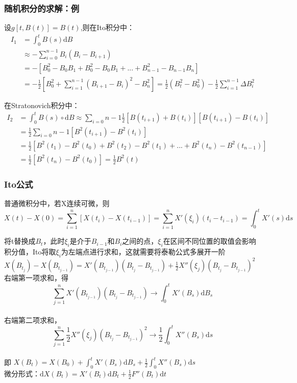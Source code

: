 \documentclass{ctexbeamer}
\begin{document}
	\begin{frame}

		\frametitle{随机积分的求解：例}
		\footnotesize
		设$g[t,B(t)]=B(t)$,则在Ito积分中：
		\begin{align}
		I_1 &= \int_0^t B(s)\mathrm{d}B \\ 
		    &\approx -\sum_{i=0}^{n-1}B_i(B_i-B_{i+1}) \\
			&=-[B_0^2-B_0B_1+B_0^2-B_0B_1+...+B_{n-1}^2-B_{n-1}B_n] \\
			&=-\frac{1}{2}[B_0^2+\sum_{i=1}^{n-1}(B_{i+1}-B_i)^2-B_n^2]=\frac{1}{2}(B_t^2-B_0^2)-\frac{1}{2}\sum_{i=1}^{n-1}\Delta B_i^2
		\end{align}
		
		在Stratonovich积分中：
		\begin{align}
		I_2 &= \int_0^t B(s)∘\mathrm{d}B \approx \sum_{i=0}{n-1}\frac{1}{2}[B(t_{i+1})+B(t_i)][B(t_{i+1})-B(t_i)]\\
			&= \frac{1}{2}\sum_{i=0}{n-1}[B^2(t_{i+1})-B^2(t_i)]\\
			&= \frac{1}{2}[B^2(t_1)-B^2(t_0)+B^2(t_2)-B^2(t_1)+...+B^2(t_n)-B^2(t_{n-1})]\\
			&= \frac{1}{2}[B^2(t_n)-B^2(t_0)] = \frac{1}{2}B^2(t)
		\end{align}

	\end{frame}

   \begin{frame}

		\frametitle{Ito公式}
		\footnotesize

		普通微积分中，若X连续可微，则$$X(t)-X(0)=\sum_{i=1}^n[X(t_i)-X(t_{i-1})]=\sum_{i=1}^nX'({\xi}_i)(t_i-t_{i-1})=\int_0^t X'(s)\mathrm{d}s$$

		将t替换成$B_t$，此时$\xi_i$是介于$B_{i-1}$和$B_i$之间的点，$\xi_i$在区间不同位置的取值会影响积分值，Ito将取${\xi_i}$为左端点进行求和，这就需要将泰勒公式多展开一阶
$X(B_{t_j})-X(B_{t_{j-1}}) = X'(B_{t_{j-1}})(B_{t_j}-B_{t_{j-1}})+\frac{1}{2}X''(\xi_j)(B_{t_j}-B_{t_{j-1}})^2$\\
		右端第一项求和，得$$\sum_{j=1}^nX'(B_{t_{j-1}})(B_{t_j}-B_{t_{j-1}}) \rightarrow \int_0^tX'(B_s)\mathrm{d}B_s$$\\
		右端第二项求和，$$\sum_{j=1}^n\frac{1}{2}X''(\xi_j)(B_{t_j}-B_{t_{j-1}})^2 \rightarrow \frac{1}{2}\int_0^tX''(B_s)\mathrm{d}s$$\\
		即 $X(B_t) = X(B_0) + \int_0^tX'(B_s)\mathrm{d}B_s + \frac{1}{2}\int_0^tX''(B_s)\mathrm{d}s$\\
		微分形式：$\mathrm{d}X(B_t) = X'(B_t)\mathrm{d}B_t + \frac{1}{2}F''(B_t)\mathrm{d}t$

    \end{frame}
\end{document}
